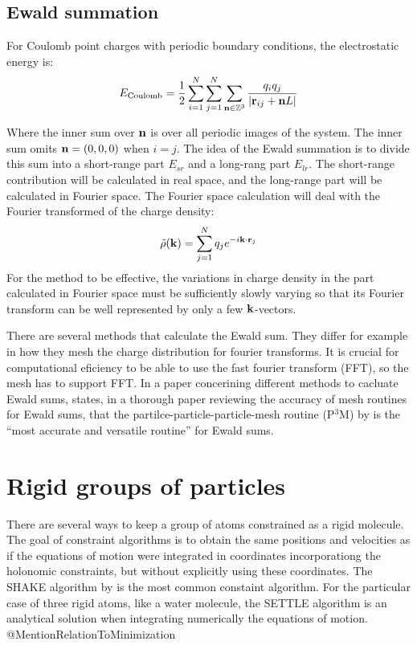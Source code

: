 \subsection{Ewald summation}
For Coulomb point charges with periodic boundary conditions, the electrostatic energy is:
\begin{equation}
	E_{\text{Coulomb}} = \frac{1}{2} \sum_{i=1}^N\sum_{j=1}^N \sum_{\mathbf{n} \in \mathbb{Z}^3} \frac{q_iq_j}{|\mathbf{r}_{ij}+\mathbf{n} L|} 
\end{equation}

Where the inner sum over $\mathbf{n}$ is over all periodic images of the system. The inner sum omits $\mathbf{n} = (0, 0, 0)$ when $i=j$. The idea of the Ewald summation is to divide this sum into a short-range part $E_{sr}$ and a long-rang part $E_{lr}$. The short-range contribution will be calculated in real space, and the long-range part will be calculated in Fourier space. The Fourier space calculation will deal with the Fourier transformed of the charge density:
\begin{equation}
	\tilde{\rho}(\mathbf{k}) = \sum_{j=1}^N q_j e^{-i\mathbf{k}\cdot \mathbf{r}_j}
\end{equation}
For the method to be effective, the variations in charge density in the part calculated in Fourier space must be sufficiently slowly varying so that its Fourier transform can be well represented by only a few $\mathbf{k}$-vectors.

There are several methods that calculate the Ewald sum. They differ for example in how they mesh the charge distribution for fourier transforms. It is crucial for computational eficiency to be able to use the fast fourier transform (FFT), so the mesh has to support FFT. In a paper concerining different methods to cacluate Ewald sums, \citet{Deserno1998} states, in a thorough paper reviewing the accuracy of mesh routines for Ewald sums, that the partilce-particle-particle-mesh routine (P$^3$M) by \citet{Hockney:1988:CSU:62815} is the ``most accurate and versatile routine'' for Ewald sums. 

\section{Rigid groups of particles}
There are several ways to keep a group of atoms constrained as a rigid molecule. The goal of constraint algorithms is to obtain the same positions and velocities as if the equations of motion were integrated in coordinates incorporationg the holonomic constraints, but without explicitly using these coordinates. The SHAKE algorithm by \citet{Ryckaert1977} is the most common constaint algorithm. For the particular case of three rigid atoms, like a water molecule, the SETTLE algorithm \cite{Miyamoto1992} is an analytical solution when integrating numerically the equations of motion. 
\label{sec:shake}
@MentionRelationToMinimization


